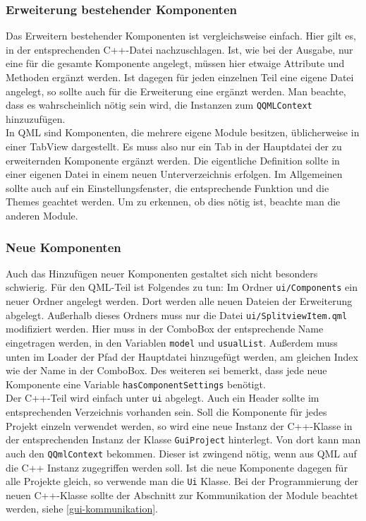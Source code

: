 \subsubsection{Erweiterung bestehender Komponenten}
Das Erweitern bestehender Komponenten ist vergleichsweise einfach. Hier gilt es, in der entsprechenden C++-Datei nachzuschlagen. Ist, wie bei der Ausgabe, nur eine für die gesamte Komponente angelegt, müssen hier etwaige Attribute und Methoden ergänzt werden. Ist dagegen für jeden einzelnen Teil eine eigene Datei angelegt, so sollte auch für die Erweiterung eine ergänzt werden. Man beachte, dass es wahrscheinlich nötig sein wird, die Instanzen zum \texttt{QQMLContext} hinzuzufügen.\\
In QML sind Komponenten, die mehrere eigene Module besitzen, üblicherweise in einer TabView dargestellt. Es muss also nur ein Tab in der Hauptdatei der zu erweiternden Komponente ergänzt werden. Die eigentliche Definition sollte in einer eigenen Datei in einem neuen Unterverzeichnis erfolgen. Im Allgemeinen sollte auch auf ein Einstellungsfenster, die entsprechende Funktion und die Themes geachtet werden. Um zu erkennen, ob dies nötig ist, beachte man die anderen Module.

\subsubsection{Neue Komponenten}
Auch das Hinzufügen neuer Komponenten gestaltet sich nicht besonders schwierig. Für den QML-Teil ist Folgendes zu tun: Im Ordner \texttt{ui/Components} ein neuer Ordner angelegt werden. Dort werden alle neuen Dateien der Erweiterung abgelegt. Außerhalb dieses Ordners muss nur die Datei \texttt{ui/SplitviewItem.qml} modifiziert werden. Hier muss in der ComboBox der entsprechende Name eingetragen werden, in den Variablen \texttt{model} und \texttt{usualList}. Außerdem muss unten im Loader der Pfad der Hauptdatei hinzugefügt werden, am gleichen Index wie der Name in der ComboBox. Des weiteren sei bemerkt, dass jede neue Komponente eine Variable \texttt{hasComponentSettings} benötigt.\\
 Der C++-Teil wird einfach unter \texttt{ui} abgelegt. Auch ein Header sollte im entsprechenden Verzeichnis vorhanden sein. Soll die Komponente für jedes Projekt einzeln verwendet werden, so wird eine neue Instanz der C++-Klasse in der entsprechenden Instanz der Klasse \texttt{GuiProject} hinterlegt. Von dort kann man auch den \texttt{QQmlContext} bekommen. Dieser ist zwingend nötig, wenn aus QML auf die C++ Instanz zugegriffen werden soll. Ist die neue Komponente dagegen für alle Projekte gleich, so verwende man die \texttt{Ui} Klasse. Bei der Programmierung der neuen C++-Klasse sollte der Abschnitt zur Kommunikation der Module beachtet werden, siehe \autoref{gui-kommunikation}.
 



